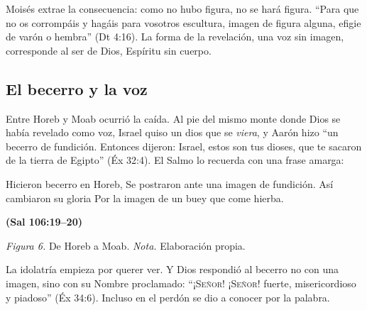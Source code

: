 \documentclass[11pt,letterpaper]{article}
\newcommand{\SENOR}{\textsc{Señor}}
\newcommand{\fuente}[1]{\par\hfill{\upshape\bfseries\small\textcolor{azul}{#1}}}
\begin{document}
Moisés extrae la consecuencia: como no hubo figura, no se hará figura. ``Para que no os corrompáis y hagáis para vosotros escultura, imagen de figura alguna, efigie de varón o hembra'' (Dt 4:16). La forma de la revelación, una voz sin imagen, corresponde al ser de Dios, Espíritu sin cuerpo.

\subsection{El becerro y la voz}

Entre Horeb y Moab ocurrió la caída. Al pie del mismo monte donde Dios se había revelado como voz, Israel quiso un dios que se \emph{viera}, y Aarón hizo ``un becerro de fundición. Entonces dijeron: Israel, estos son tus dioses, que te sacaron de la tierra de Egipto'' (Éx 32:4). El Salmo lo recuerda con una frase amarga:

\begin{cita}Hicieron becerro en Horeb, Se postraron ante una imagen de fundición. Así cambiaron su gloria Por la imagen de un buey que come hierba.\fuente{(Sal 106:19--20)}\end{cita}

\begin{center}
\par
{\footnotesize\color{gris}\textit{Figura 6.} De Horeb a Moab. \textit{Nota.} Elaboración propia.}
\end{center}

La idolatría empieza por querer ver. Y Dios respondió al becerro no con una imagen, sino con su Nombre proclamado: ``¡\SENOR! ¡\SENOR! fuerte, misericordioso y piadoso'' (Éx 34:6). Incluso en el perdón se dio a conocer por la palabra.
\end{document}

